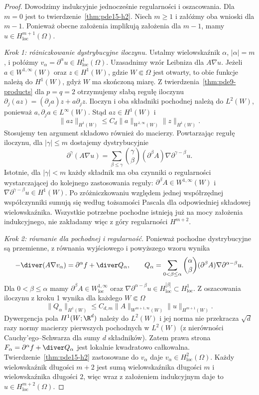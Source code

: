 \begin{proof}
Dowodzimy indukcyjnie jednocześnie regularności i oszacowania.
Dla $m=0$ jest to twierdzenie~\ref{thm:pde15-h2}.
Niech $m\ge1$ i załóżmy oba wnioski dla $m-1$.
Ponieważ obecne założenia implikują założenia dla $m-1$,
mamy $u\in H^{m+1}_{\mathrm{loc}}(\Omega)$.

\emph{Krok 1: różniczkowanie dystrybucyjne iloczynu.}
Ustalmy wielowskaźnik $\alpha$, $|\alpha|=m$, i połóżmy
$v_\alpha=\partial^\alpha u\in H^1_{\mathrm{loc}}(\Omega)$.
Uzasadnimy wzór Leibniza dla $A\nabla u$.
Jeżeli $a\in W^{1,\infty}(W)$ oraz $z\in H^1(W)$,
gdzie $W\Subset\Omega$ jest otwarty, to obie funkcje
należą do $H^1(W)$, gdyż $W$ ma skończoną miarę.
Z twierdzenia~\ref{thm:pde9-products} dla $p=q=2$
otrzymujemy słabą regułę iloczynu
$\partial_j(az)=(\partial_j a)z+a\partial_j z$.
Iloczyn i oba składniki pochodnej należą do $L^2(W)$,
ponieważ $a,\partial_j a\in L^\infty(W)$.
Stąd $az\in H^1(W)$ i
\[
 \|az\|_{H^1(W)}
 \le C_d\|a\|_{W^{1,\infty}(W)}\|z\|_{H^1(W)}.
\]
Stosujemy ten argument składowo również do macierzy.
Powtarzając regułę iloczynu, dla $|\gamma|\le m$ dostajemy
dystrybucyjnie
\[
 \partial^\gamma(A\nabla u)=
 \sum_{\beta\le\gamma}\binom{\gamma}{\beta}
 (\partial^\beta A)\nabla\partial^{\gamma-\beta}u .
\]
Istotnie, dla $|\gamma|<m$ każdy składnik ma oba czynniki
o regularności wystarczającej do kolejnego zastosowania
reguły: $\partial^\beta A\in W^{1,\infty}(W)$ i
$\nabla\partial^{\gamma-\beta}u\in H^1(W)$.
Po zróżniczkowaniu względem jednej współrzędnej
współczynniki sumują się według tożsamości Pascala
dla odpowiedniej składowej wielowskaźnika.
Wszystkie potrzebne pochodne istnieją już na mocy
założenia indukcyjnego, nie zakładamy więc z góry
regularności $H^{m+2}$.

\emph{Krok 2: równanie dla pochodnej i regularność.}
Ponieważ pochodne dystrybucyjne są przemienne,
z równania wyjściowego i powyższego wzoru wynika
\[
 -\diver(A\nabla v_\alpha)=\partial^\alpha f+\diver Q_\alpha,
 \qquad
 Q_\alpha=\sum_{0<\beta\le\alpha}\binom{\alpha}{\beta}
 (\partial^\beta A)\nabla\partial^{\alpha-\beta}u .
\]
Dla $0<\beta\le\alpha$ mamy
$\partial^\beta A\in W^{1,\infty}_{\mathrm{loc}}$
oraz $\nabla\partial^{\alpha-\beta}u\in
H^{|\beta|}_{\mathrm{loc}}\subset H^1_{\mathrm{loc}}$.
Z oszacowania iloczynu z kroku 1 wynika dla każdego
$W\Subset\Omega$
\[
 \|Q_\alpha\|_{H^1(W)}
 \le C_{d,m}\|A\|_{W^{m+1,\infty}(W)}\|u\|_{H^{m+1}(W)}.
\]
Dywergencja pola $H^1(W;\R^d)$ należy do $L^2(W)$
i jej norma nie przekracza $\sqrt d$ razy normy
macierzy pierwszych pochodnych w $L^2(W)$
(z nierówności Cauchy'ego--Schwarza dla sumy $d$ składników).
Zatem prawa strona $F_\alpha=\partial^\alpha f+\diver Q_\alpha$
jest lokalnie kwadratowo całkowalna.
Twierdzenie~\ref{thm:pde15-h2} zastosowane do $v_\alpha$
daje $v_\alpha\in H^2_{\mathrm{loc}}(\Omega)$.
Każdy wielowskaźnik długości $m+2$ jest sumą
wielowskaźnika długości $m$ i wielowskaźnika długości $2$,
więc wraz z założeniem indukcyjnym daje to
$u\in H^{m+2}_{\mathrm{loc}}(\Omega)$.


\end{proof}
